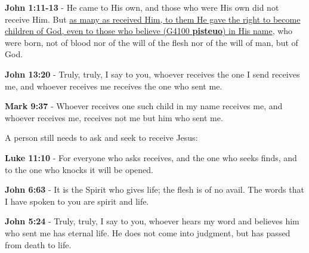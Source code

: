 \documentclass[11pt]{article}
\begin{document}
\textbf{John 1:11-13} - He came to His own, and those who were His own did not receive Him. But \uline{as many as received Him, to them He gave the right to become children of God, even to those who believe (G4100 \textbf{pisteuo}) in His name}, who were born, not of blood nor of the will of the flesh nor of the will of man, but of God.

\textbf{John 13:20} - Truly, truly, I say to you, whoever receives the one I send receives me, and whoever receives me receives the one who sent me.

\textbf{Mark 9:37} - Whoever receives one such child in my name receives me, and whoever receives me, receives not me but him who sent me.

A person still needs to ask and seek to receive Jesus:

\textbf{Luke 11:10} - For everyone who asks receives, and the one who seeks finds, and to the one who knocks it will be opened.

\textbf{John 6:63} - It is the Spirit who gives life; the flesh is of no avail. The words that I have spoken to you are spirit and life.

\textbf{John 5:24} - Truly, truly, I say to you, whoever hears my word and believes him who sent me has eternal life. He does not come into judgment, but has passed from death to life.
\end{document}
